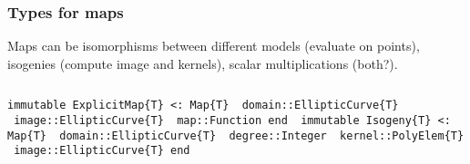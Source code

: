 \documentclass[12pt]{beamer}
\begin{document}
\begin{frame}
 \frametitle{Types for maps}
 
 Maps can be isomorphisms between different models (evaluate on points), isogenies (compute image and kernels), scalar multiplications (both?).
 
 \pause
 \begin{center}
 \end{center}
 
 \begin{columns}
   \scriptsize\tt immutable ExplicitMap\{T\} <: Map\{T\}\newline
	\ \quad domain::EllipticCurve\{T\} \newline
	\ \quad image::EllipticCurve\{T\} \newline
	\ \quad map::Function\newline
	end  \newline
  \scriptsize\tt
  immutable Isogeny\{T\} <: Map\{T\}\newline
	\ \quad domain::EllipticCurve\{T\}\newline
	\ \quad degree::Integer\newline
	\ \quad kernel::PolyElem\{T\}\newline
	\ \quad image::EllipticCurve\{T\}\newline
	end
 \end{columns}
\end{frame}
\end{document}
